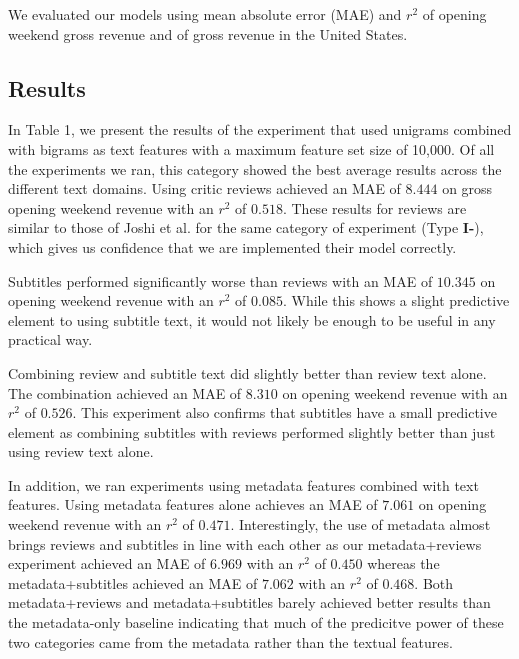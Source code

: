\documentclass[11pt]{article}
\begin{document}
We evaluated our models using mean absolute error (MAE) and $r^2$ of opening weekend gross
revenue and of gross revenue in the United States. 

\subsection{Results}
In Table 1, we present the results of the experiment that used unigrams combined with
bigrams as text features with a maximum feature set size of 10,000. Of all the experiments
we ran, this category showed the best average results across the different text domains.
Using critic reviews achieved an MAE of $8.444$ on gross opening weekend revenue with
an $r^2$ of $0.518$. These results for reviews are similar to those of Joshi et al. for
the same category of experiment (Type \textbf{I-}), which gives us confidence that we
are implemented their model correctly.

Subtitles performed significantly worse than reviews with an MAE of $10.345$ on opening
weekend revenue with an $r^2$ of $0.085$. While this shows a slight predictive element
to using subtitle text, it would not likely be enough to be useful in any practical way.

Combining review and subtitle text did slightly better than review text alone. The
combination achieved an MAE of $8.310$ on opening weekend revenue with an $r^2$ of
$0.526$. This experiment also confirms that subtitles have a small predictive element
as combining subtitles with reviews performed slightly better than just using review text
alone.

In addition, we ran experiments using metadata features combined with text features. Using
metadata features alone achieves an MAE of $7.061$ on opening weekend revenue with an
$r^2$ of $0.471$. Interestingly, the use of metadata almost brings reviews and subtitles
in line with each other as our metadata+reviews experiment achieved an MAE of $6.969$ with
an $r^2$ of $0.450$ whereas the metadata+subtitles achieved an MAE of $7.062$ with an
$r^2$ of $0.468$. Both metadata+reviews and metadata+subtitles barely achieved better
results than the metadata-only baseline indicating that much of the predicitve power of
these two categories came from the metadata rather than the textual features.
\end{document}
